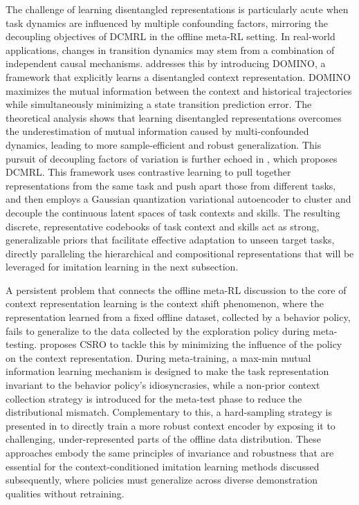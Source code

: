 \documentclass[11pt]{article}
\begin{document}
The challenge of learning disentangled representations is particularly acute when task dynamics are influenced by multiple confounding factors, mirroring the decoupling objectives of DCMRL in the offline meta-RL setting. In real-world applications, changes in transition dynamics may stem from a combination of independent causal mechanisms. \cite{ref312} addresses this by introducing DOMINO, a framework that explicitly learns a disentangled context representation. DOMINO maximizes the mutual information between the context and historical trajectories while simultaneously minimizing a state transition prediction error. The theoretical analysis shows that learning disentangled representations overcomes the underestimation of mutual information caused by multi-confounded dynamics, leading to more sample-efficient and robust generalization. This pursuit of decoupling factors of variation is further echoed in \cite{ref321}, which proposes DCMRL. This framework uses contrastive learning to pull together representations from the same task and push apart those from different tasks, and then employs a Gaussian quantization variational autoencoder to cluster and decouple the continuous latent spaces of task contexts and skills. The resulting discrete, representative codebooks of task context and skills act as strong, generalizable priors that facilitate effective adaptation to unseen target tasks, directly paralleling the hierarchical and compositional representations that will be leveraged for imitation learning in the next subsection.

A persistent problem that connects the offline meta-RL discussion to the core of context representation learning is the context shift phenomenon, where the representation learned from a fixed offline dataset, collected by a behavior policy, fails to generalize to the data collected by the exploration policy during meta-testing. \cite{ref335} proposes CSRO to tackle this by minimizing the influence of the policy on the context representation. During meta-training, a max-min mutual information learning mechanism is designed to make the task representation invariant to the behavior policy's idiosyncrasies, while a non-prior context collection strategy is introduced for the meta-test phase to reduce the distributional mismatch. Complementary to this, a hard-sampling strategy is presented in \cite{ref334} to directly train a more robust context encoder by exposing it to challenging, under-represented parts of the offline data distribution. These approaches embody the same principles of invariance and robustness that are essential for the context-conditioned imitation learning methods discussed subsequently, where policies must generalize across diverse demonstration qualities without retraining.
\end{document}
